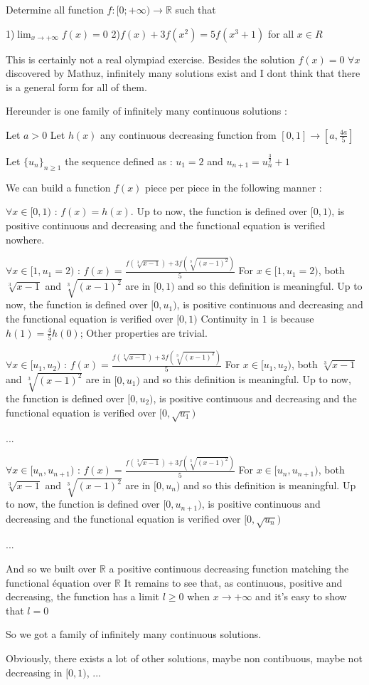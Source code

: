 \begin{solution}
	\begin{tcolorbox}Determine all function $f: \mathbb[0;+\infty)\to\mathbb{R}$ such that

1)$\lim_{x\to+\infty}f(x)=0$    2)$f(x)+3f(x^2)=5f(x^3+1)$ for all $x\in{R}$\end{tcolorbox}
This is certainly not a real olympiad exercise.
Besides the solution $f(x)=0$ $\forall x$ discovered by Mathuz, infinitely many solutions exist and I dont think that there is a general form for all of them.

Hereunder is one family of infinitely many continuous solutions :

Let $a>0$
Let $h(x)$ any continuous decreasing function from $[0,1]\to [a,\frac{4a}5]$

Let $\{u_n\}_{n\ge 1}$ the sequence defined as : $u_1=2$ and $u_{n+1}=u_n^{\frac 32}+1$

We can build a function $f(x)$ piece per piece in the following manner :

$\forall x\in[0,1)$ : $f(x)=h(x)$. 
Up to now, the function is defined over $[0,1)$, is positive continuous and decreasing and the functional equation is verified nowhere.

$\forall x\in[1,u_1=2)$ : $f(x)=\frac{f(\sqrt[3]{x-1})+3f(\sqrt[3]{(x-1)^2})}5$
For $x\in[1,u_1=2)$, both $\sqrt[3]{x-1}$ and $\sqrt[3]{(x-1)^2}$ are in $[0,1)$ and so this definition is meaningful.
Up to now, the function is defined over $[0,u_1)$, is positive continuous and decreasing and the functional equation is verified over $[0,1)$
Continuity in $1$ is because $h(1)=\frac 45h(0)$; Other properties are trivial.

$\forall x\in[u_1,u_2)$ : $f(x)=\frac{f(\sqrt[3]{x-1})+3f(\sqrt[3]{(x-1)^2})}5$
For $x\in[u_1,u_2)$, both $\sqrt[3]{x-1}$ and $\sqrt[3]{(x-1)^2}$ are in $[0,u_1)$ and so this definition is meaningful.
Up to now, the function is defined over $[0,u_2)$, is positive continuous and decreasing and the functional equation is verified over $[0,\sqrt{u_1})$

...

$\forall x\in[u_n,u_{n+1})$ : $f(x)=\frac{f(\sqrt[3]{x-1})+3f(\sqrt[3]{(x-1)^2})}5$
For $x\in[u_n,u_{n+1})$, both $\sqrt[3]{x-1}$ and $\sqrt[3]{(x-1)^2}$ are in $[0,u_n)$ and so this definition is meaningful.
Up to now, the function is defined over $[0,u_{n+1})$, is positive continuous and decreasing and the functional equation is verified over $[0,\sqrt{u_n})$

...

And so we built over $\mathbb R$ a positive continuous decreasing function matching the functional équation over $\mathbb R$
It remains to see that, as continuous, positive and decreasing, the function has a limit $l\ge 0$ when $x\to +\infty$ and it's easy to show that $l=0$

So we got a family of infinitely many continuous solutions.

Obviously, there exists a lot of other solutions, maybe non contibuous, maybe not decreasing in $[0,1)$, ...
\end{solution}
